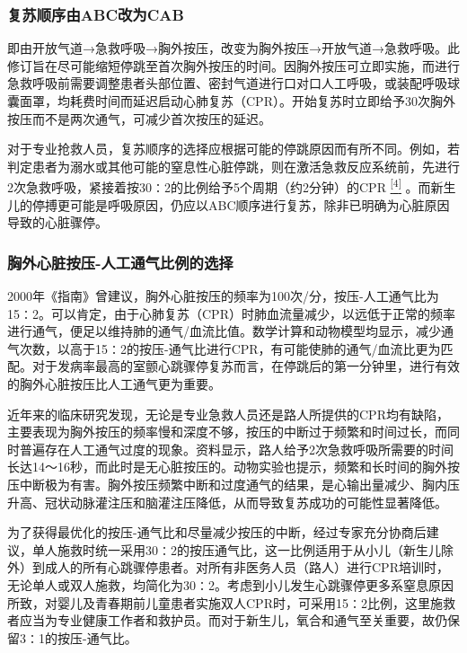 \subsubsection{复苏顺序由ABC改为CAB}

即由开放气道→急救呼吸→胸外按压，改变为胸外按压→开放气道→急救呼吸。此修订旨在尽可能缩短停跳至首次胸外按压的时间。因胸外按压可立即实施，而进行急救呼吸前需要调整患者头部位置、密封气道进行口对口人工呼吸，或装配呼吸球囊面罩，均耗费时间而延迟启动心肺复苏（CPR）。开始复苏时立即给予30次胸外按压而不是两次通气，可减少首次按压的延迟。

对于专业抢救人员，复苏顺序的选择应根据可能的停跳原因而有所不同。例如，若判定患者为溺水或其他可能的窒息性心脏停跳，则在激活急救反应系统前，先进行2次急救呼吸，紧接着按30∶2的比例给予5个周期（约2分钟）的CPR
\protect\hyperlink{text00023.htmlux5cux23ch4-22}{\textsuperscript{{[}4{]}}}
。而新生儿的停搏更可能是呼吸原因，仍应以ABC顺序进行复苏，除非已明确为心脏原因导致的心脏骤停。

\subsubsection{胸外心脏按压-人工通气比例的选择}

2000年《指南》曾建议，胸外心脏按压的频率为100次/分，按压-人工通气比为15∶2。可以肯定，由于心肺复苏（CPR）时肺血流量减少，以远低于正常的频率进行通气，便足以维持肺的通气/血流比值。数学计算和动物模型均显示，减少通气次数，以高于15∶2的按压-通气比进行CPR，有可能使肺的通气/血流比更为匹配。对于发病率最高的室颤心跳骤停复苏而言，在停跳后的第一分钟里，进行有效的胸外心脏按压比人工通气更为重要。

近年来的临床研究发现，无论是专业急救人员还是路人所提供的CPR均有缺陷，主要表现为胸外按压的频率慢和深度不够，按压的中断过于频繁和时间过长，而同时普遍存在人工通气过度的现象。资料显示，路人给予2次急救呼吸所需要的时间长达14～16秒，而此时是无心脏按压的。动物实验也提示，频繁和长时间的胸外按压中断极为有害。胸外按压频繁中断和过度通气的结果，是心输出量减少、胸内压升高、冠状动脉灌注压和脑灌注压降低，从而导致复苏成功的可能性显著降低。

为了获得最优化的按压-通气比和尽量减少按压的中断，经过专家充分协商后建议，单人施救时统一采用30∶2的按压通气比，这一比例适用于从小儿（新生儿除外）到成人的所有心跳骤停患者。对所有非医务人员（路人）进行CPR培训时，无论单人或双人施救，均简化为30∶2。考虑到小儿发生心跳骤停更多系窒息原因所致，对婴儿及青春期前儿童患者实施双人CPR时，可采用15∶2比例，这里施救者应当为专业健康工作者和救护员。而对于新生儿，氧合和通气至关重要，故仍保留3∶1的按压-通气比。

